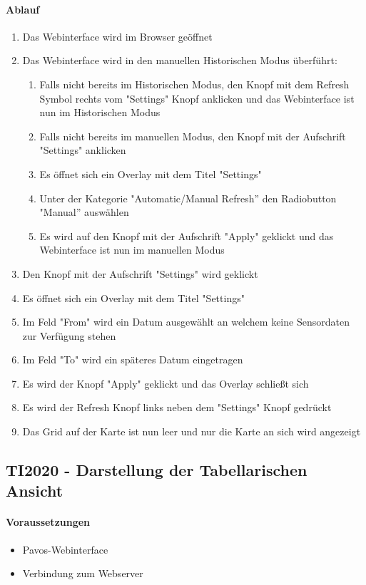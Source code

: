 \paragraph{Ablauf}
\begin{enumerate}
\item Das Webinterface wird im Browser geöffnet
\item Das Webinterface wird in den manuellen Historischen Modus überführt:
\begin{enumerate}
\item Falls nicht bereits im Historischen Modus, den Knopf mit dem Refresh Symbol rechts vom "Settings" Knopf anklicken und das Webinterface ist nun im Historischen Modus
\item Falls nicht bereits im manuellen Modus, den Knopf mit der Aufschrift "Settings" anklicken
\item Es öffnet sich ein Overlay mit dem Titel "Settings"
\item Unter der Kategorie "Automatic/Manual Refresh'' den Radiobutton "Manual'' auswählen
\item Es wird auf den Knopf mit der Aufschrift "Apply" geklickt und das Webinterface ist nun im manuellen Modus
\end{enumerate}
\item Den Knopf mit der Aufschrift "Settings" wird geklickt
\item Es öffnet sich ein Overlay mit dem Titel "Settings"
\item Im Feld "From" wird ein Datum ausgewählt an welchem keine Sensordaten zur Verfügung stehen
\item Im Feld "To" wird ein späteres Datum eingetragen
\item Es wird der Knopf "Apply" geklickt und das Overlay schließt sich
\item Es wird der Refresh Knopf links neben dem "Settings" Knopf gedrückt
\item Das Grid auf der Karte ist nun leer und nur die Karte an sich wird angezeigt
\end{enumerate}
\szenarioOk

\subsection{TI2020 - Darstellung der Tabellarischen Ansicht}
\paragraph{Voraussetzungen}
\begin{itemize}
\item Pavos-Webinterface
\item Verbindung zum Webserver
\end{itemize}
